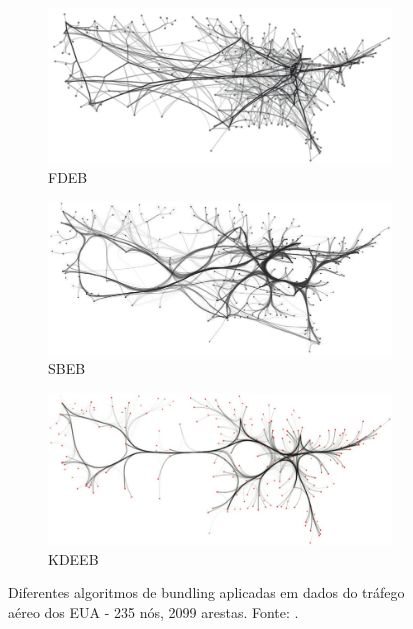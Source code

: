 \begin{figure}[!htb]
  \centering
  \begin{subfigure}{0.6\textwidth}
    \centering
    \includegraphics[width=1\textwidth]{../figuras/FDEB.png}
    \caption{FDEB}
    \label{fig:FDEB}
  \end{subfigure}

  \begin{subfigure}{0.6\textwidth}
    \centering
    \includegraphics[width=1\textwidth]{../figuras/SBEB.png}
    \caption{SBEB}
    \label{fig:SBEB}
  \end{subfigure}

  \begin{subfigure}{0.6\textwidth}
    \centering
    \includegraphics[width=1\textwidth]{../figuras/KDEEB.png}
    \caption{KDEEB}
    \label{fig:KDEEB}
  \end{subfigure}
  \caption[Diferentes algoritmos de bundling aplicadas nos mesmos dados]{Diferentes algoritmos de bundling aplicadas em dados do tráfego aéreo dos EUA - 235 nós, 2099 arestas. Fonte: \citep{Klein2013}.}
  \label{fig:subfigures}
\end{figure}

